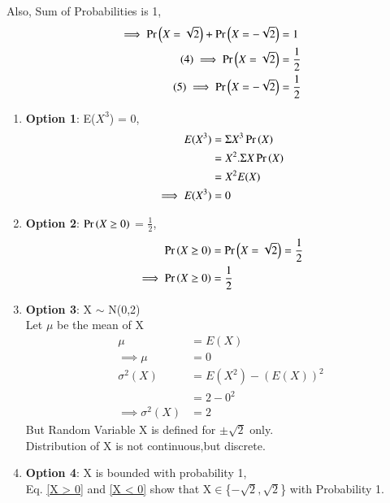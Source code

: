 \documentclass[journal,12pt,twocolumn]{IEEEtran}
\begin{document}
Also, Sum of Probabilities is 1,
\begin{align*}
    \implies \Pr\left(X = \sqrt{2}\right) + \Pr\left(X =-\sqrt{2}\right) &= 1 \\
    \tag{4} \label{X > 0}
    \implies                     \Pr\left(X = \sqrt{2}\right) &= \frac{1}{2} \\
    \tag{5} \label{X < 0}
    \implies                    \Pr\left(X = -\sqrt{2}\right) &= \frac{1}{2}
\end{align*}
\begin{enumerate}
\item \textbf{Option 1}: E($X^3$) = 0,
\begin{align*}
    E(X^3) &= \Sigma X^3 \Pr\left(X\right) \\
           &= X^2 .\Sigma X \Pr\left(X\right) \\
           &= X^2 E(X)\\
\implies E(X^3) &= 0      
\end{align*} 
\begin{center}
\end{center}
\vspace{0.8cm}
\item \textbf{Option 2}: $\Pr\left(X \ge 0\right)$ = $\frac{1}{2}$,
\begin{align*}
    \Pr\left(X\ge 0\right) &= \Pr\left(X = \sqrt{2}\right) = \frac{1}{2} \\
    \implies \Pr\left(X \ge 0\right) &= \frac{1}{2}
\end{align*}
\begin{center}
\end{center}
\vspace{0.1cm}
\item \textbf{Option 3}: X $\sim$ N(0,2) \\
Let $\mu$ be the mean of X
\begin{align*}
            \mu &= E(X) \\
    \tag{6} \label{mu}
   \implies \mu &= 0 \\
      \sigma^2(X) &= E(X^2) - (E(X))^{2} \\
                &= 2 - 0^{2} \\
                \tag{7} 
\implies \sigma^2(X) &= 2
\end{align*}
But Random Variable X is defined for $\pm\sqrt{2}$ only.\\
Distribution of X is not continuous,but discrete.
\vspace{0.3cm}
\begin{center}
\end{center}
\vspace{0.3cm}
\item \textbf{Option 4}: X is bounded with probability 1, \\
Eq. \eqref{X > 0} and \eqref{X < 0} show that X$\in$\{{$-\sqrt{2},\sqrt{2}$}\} with Probability 1. 
\vspace{0.5cm} \\
\centering {}
\end{enumerate}
\vspace{0.5cm}
\centering {}
\end{document}
